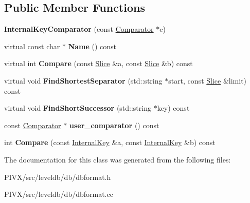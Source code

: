 \subsection*{Public Member Functions}
\begin{DoxyCompactItemize}
\item 
\mbox{\label{classleveldb_1_1_internal_key_comparator_a0069a8b4828f592da66937e2c3471080}} 
{\bfseries Internal\+Key\+Comparator} (const \mbox{\hyperlink{structleveldb_1_1_comparator}{Comparator}} $\ast$c)
\item 
\mbox{\label{classleveldb_1_1_internal_key_comparator_ae8848b098c0c20071aa93a166b80de0d}} 
virtual const char $\ast$ {\bfseries Name} () const
\item 
\mbox{\label{classleveldb_1_1_internal_key_comparator_a8ee088d285165f692f2f03ac5b3e13b1}} 
virtual int {\bfseries Compare} (const \mbox{\hyperlink{classleveldb_1_1_slice}{Slice}} \&a, const \mbox{\hyperlink{classleveldb_1_1_slice}{Slice}} \&b) const
\item 
\mbox{\label{classleveldb_1_1_internal_key_comparator_a876984ae99b1404b4074be4d92cab421}} 
virtual void {\bfseries Find\+Shortest\+Separator} (std\+::string $\ast$start, const \mbox{\hyperlink{classleveldb_1_1_slice}{Slice}} \&limit) const
\item 
\mbox{\label{classleveldb_1_1_internal_key_comparator_a221a28a524474834b2cba5c3be84cb13}} 
virtual void {\bfseries Find\+Short\+Successor} (std\+::string $\ast$key) const
\item 
\mbox{\label{classleveldb_1_1_internal_key_comparator_ac8c5db699e5defed74c6b17ddadf90f8}} 
const \mbox{\hyperlink{structleveldb_1_1_comparator}{Comparator}} $\ast$ {\bfseries user\+\_\+comparator} () const
\item 
\mbox{\label{classleveldb_1_1_internal_key_comparator_a715d8e2eb246df39248ce54789fb4621}} 
int {\bfseries Compare} (const \mbox{\hyperlink{classleveldb_1_1_internal_key}{Internal\+Key}} \&a, const \mbox{\hyperlink{classleveldb_1_1_internal_key}{Internal\+Key}} \&b) const
\end{DoxyCompactItemize}


The documentation for this class was generated from the following files\+:\begin{DoxyCompactItemize}
\item 
P\+I\+V\+X/src/leveldb/db/dbformat.\+h\item 
P\+I\+V\+X/src/leveldb/db/dbformat.\+cc\end{DoxyCompactItemize}
